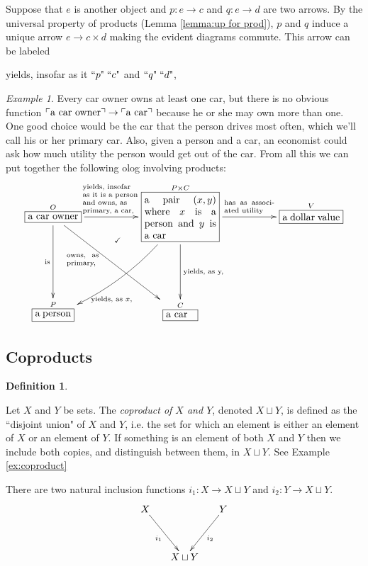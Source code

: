\documentclass{book}
\def\tn{\textnormal}
\newcommand{\qt}[1]{\tn{``}#1\tn{"}}
\def\to{\rightarrow}
\def\taking{\colon}
\def\rr{\raggedright}
\newcommand{\LA}[2]{\ar[#1]^-{\tn {#2}}}
\newcommand{\LAL}[2]{\ar[#1]_-{\tn {#2}}}
\newcommand{\obox}[3]{\stackrel{#1}{\fbox{\parbox{#2}{#3}}}}
\newcommand{\fakebox}[1]{\tn{$\ulcorner$#1$\urcorner$}}
\theoremstyle{remark}
\newtheorem{example}[subsubsection]{Example}
\theoremstyle{definition}
\newtheorem{definition}[subsubsection]{Definition}
\begin{document}
Suppose that $e$ is another object and $p\taking e\to c$ and $q\taking e\to d$ are two arrows. By the universal property of products (Lemma \ref{lemma:up for prod}), $p$ and $q$ induce a unique arrow $e\to c\times d$ making the evident diagrams commute. This arrow can be labeled
\begin{center}
yields, insofar as it $\qt{p}\;\qt{c}$ and $\qt{q}\;\qt{d}$, 
\end{center}

\begin{example}

Every car owner owns at least one car, but there is no obvious function $\fakebox{a car owner}\to\fakebox{a car}$ because he or she may own more than one. One good choice would be the car that the person drives most often, which we'll call his or her primary car. Also, given a person and a car, an economist could ask how much utility the person would get out of the car. From all this we can put together the following olog involving products:
$$
\xymatrixnocompile{\obox{O}{.7in}{a car owner}\LAL{dd}{is}\ar[ddrr]_(.35){\parbox{.45in}{\scriptsize owns, as primary,}}\LA{rr}{\parbox{.8in}{\rr\scriptsize yields, insofar as it is a person and owns, as primary, a car,}}&\ar@{}[d]^(.4){\checkmark}&
\obox{P\times C}{1in}{a pair $(x,y)$ where $x$ is a person and $y$ is a car}\ar@/^1pc/[ddll]^(.7){\tn{yields, as }x,}\LA{dd}{\tn{yields, as }y,}\LA{rr}{\parbox{.7in}{\scriptsize has as associated utility}}&&\obox{V}{.8in}{a dollar value}\\&&\\\obox{P}{.5in}{a person}&&\obox{C}{.4in}{a car}
}
$$

\end{example}


\subsection{Coproducts}\label{sec:coproducts}

\begin{definition}\label{def:coproduct}

Let $X$ and $Y$ be sets. The {\em coproduct of $X$ and $Y$}, denoted $X\sqcup Y$, is defined as the ``disjoint union" of $X$ and $Y$, i.e. the set for which an element is either an element of $X$ or an element of $Y$. If something is an element of both $X$ and $Y$ then we include both copies, and distinguish between them, in $X\sqcup Y$. See Example \ref{ex:coproduct}

There are two natural inclusion functions $i_1\taking X\to X\sqcup Y$ and $i_2\taking Y\to X\sqcup Y$.
$$\xymatrix@=15pt{X\ar[ddr]_{i_1}&&Y\ar[ddl]^{i_2}\\\\&X\sqcup Y}$$

\end{definition}
\end{document}
